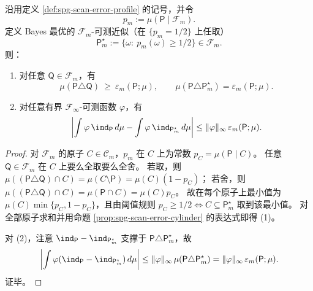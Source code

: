 
\begin{proposition}\label{prop:spg-clarity-bayes-optimality}
沿用定义 \ref{def:spg-scan-error-profile} 的记号，并令
\[
p_m:=\mu(\mathsf P\mid\mathcal F_m).
\]
定义 Bayes 最优的 \(\mathcal F_m\)-可测近似（在 \(\{p_m=1/2\}\) 上任取）
\[
\mathsf P_m^\star:=\{\omega:\ p_m(\omega)\ge 1/2\}\in\mathcal F_m.
\]
则：
\begin{enumerate}
  \item 对任意 \(\mathsf Q\in\mathcal F_m\)，有
  \[
  \mu(\mathsf P\triangle \mathsf Q)\ \ge\ \varepsilon_m(\mathsf P;\mu),
  \qquad
  \mu(\mathsf P\triangle \mathsf P_m^\star)=\varepsilon_m(\mathsf P;\mu).
  \]
  \item 对任意有界 \(\mathcal F_\infty\)-可测函数 \(\varphi\)，有
  \[
  \left|\int \varphi\,\ind_{\mathsf P}\,d\mu-\int \varphi\,\ind_{\mathsf P_m^\star}\,d\mu\right|
  \le \|\varphi\|_{\infty}\,\varepsilon_m(\mathsf P;\mu).
  \]
\end{enumerate}
\end{proposition}
\begin{proof}
对 \(\mathcal F_m\) 的原子 \(C\in\mathcal C_m\)，\(p_m\) 在 \(C\) 上为常数 \(p_C=\mu(\mathsf P\mid C)\)。
任意 \(\mathsf Q\in\mathcal F_m\) 在 \(C\) 上要么全取要么全舍。
若取，则 \(\mu((\mathsf P\triangle \mathsf Q)\cap C)=\mu(C\setminus \mathsf P)=\mu(C)(1-p_C)\)；
若舍，则 \(\mu((\mathsf P\triangle \mathsf Q)\cap C)=\mu(\mathsf P\cap C)=\mu(C)p_C\)。
故在每个原子上最小值为 \(\mu(C)\min\{p_C,1-p_C\}\)，且由阈值规则 \(p_C\ge 1/2\iff C\subseteq \mathsf P_m^\star\) 取到该最小值。
对全部原子求和并用命题 \ref{prop:spg-scan-error-cylinder} 的表达式即得 (1)。
\par
对 (2)，注意 \(\ind_{\mathsf P}-\ind_{\mathsf P_m^\star}\) 支撑于 \(\mathsf P\triangle \mathsf P_m^\star\)，故
\[
\left|\int \varphi(\ind_{\mathsf P}-\ind_{\mathsf P_m^\star})\,d\mu\right|
\le \|\varphi\|_\infty\,\mu(\mathsf P\triangle \mathsf P_m^\star)
=\|\varphi\|_\infty\,\varepsilon_m(\mathsf P;\mu).
\]
证毕。
\end{proof}

